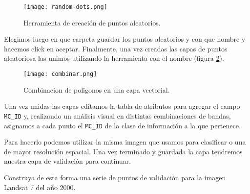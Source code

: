 \begin{exa}
  \begin{figure}[h!]
    \centering
    \texttt{[image: random-dots.png]}
    \caption{Herramienta de creaci\'on de puntos aleatorios.}
    \label{fig:dots}
  \end{figure}

  Elegimos luego en que carpeta guardar los puntos aleatorios y con que nombre y hacemos click en aceptar. Finalmente, una vez creadas las capas de puntos aleatoriosa las unimos utilizando la herramienta  con el nombre  (figura \ref{fig:combinar}).

  \begin{figure}[h!]
    \centering
    \texttt{[image: combinar.png]}
    \caption{Combinacion de poligonos en una capa vectorial.}
    \label{fig:combinar}
  \end{figure}

  Una vez unidas las capas editamos la tabla de atributos para agregar el campo \verb|MC_ID| y, realizando un an\'alisis visual en distintas combinaciones de bandas, asignamos a cada punto el \verb|MC_ID| de la clase de informaci\'on a la que pertenece.

  Para hacerlo podemos utilizar la misma imagen que usamos para clasificar o una de mayor resoluci\'on espacial. Una vez terminado y guardada la capa tendremos nuestra capa de validaci\'on para continuar.

\end{exa}

\begin{act}
  Construya de esta forma una serie de puntos de validaci\'on para la imagen Landsat 7 del a\~no 2000.
\end{act}

